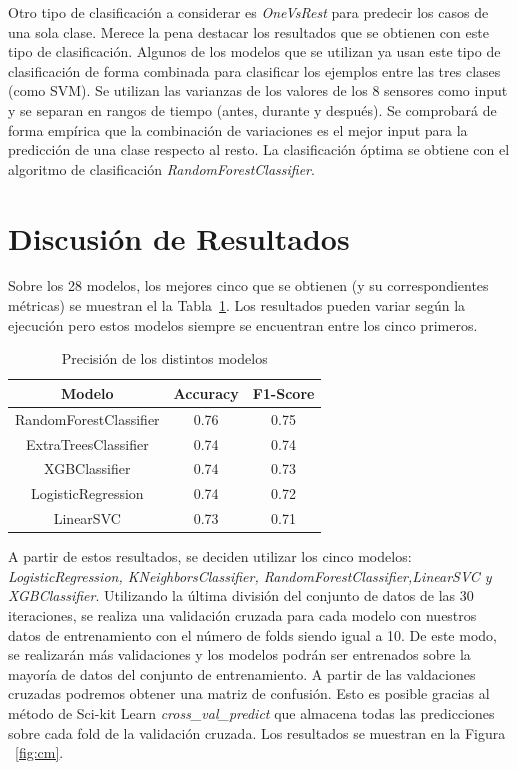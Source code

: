 \documentclass{esannV2}
\begin{document}
Otro tipo de clasificación a considerar es \textit{OneVsRest} para predecir los casos de una sola clase. Merece la pena destacar los resultados que se obtienen con este tipo de clasificación. Algunos de los modelos que se utilizan ya usan este tipo de clasificación de forma combinada para clasificar los ejemplos entre las tres clases (como SVM). Se utilizan las varianzas de los valores de los 8 sensores como input y se separan en rangos de tiempo (antes, durante y después). Se comprobará de forma empírica que la combinación de variaciones es el mejor input para la predicción de una clase respecto al resto. La clasificación óptima se obtiene con el algoritmo de clasificación \textit{RandomForestClassifier}. \\

\section{Discusión de Resultados}
Sobre los 28 modelos, los mejores cinco que se obtienen (y su correspondientes métricas) se muestran el la Tabla~\ref{tab:lazypred}. Los resultados pueden variar según la ejecución pero estos modelos siempre se encuentran entre los cinco primeros.\\

\begin{table}[!]
  \centering
  \begin{tabular}{|c|c|c|}
    \hline
    Modelo & Accuracy & F1-Score \\
    \hline
    RandomForestClassifier & 0.76 & 0.75 \\ 
	ExtraTreesClassifier & 0.74 & 0.74 \\ 
	XGBClassifier & 0.74 & 0.73 \\ 
	LogisticRegression & 0.74 & 0.72 \\ 
	LinearSVC & 0.73 & 0.71 \\ 
    \hline
  \end{tabular}
  \caption{Precisión de los distintos modelos}\label{tab:lazypred}
\end{table}

A partir de estos resultados, se deciden utilizar  los cinco modelos: \textit{LogisticRegression, KNeighborsClassifier, RandomForestClassifier,LinearSVC y XGBClassifier}. Utilizando la última división del conjunto de datos de las 30 iteraciones, se realiza una validación cruzada para cada modelo con nuestros datos de entrenamiento con el número de folds siendo igual a 10. De este modo, se realizarán más validaciones y los modelos podrán ser entrenados sobre la mayoría de datos del conjunto de entrenamiento. A partir de las valdaciones cruzadas podremos obtener una matriz de confusión. Esto es posible gracias al método de Sci-kit Learn  \textit{cross\_val\_predict} que almacena todas las predicciones sobre cada fold de la validación cruzada.  Los resultados se muestran en la Figura ~\ref{fig:cm}.  \\
\end{document}

